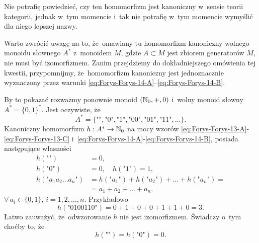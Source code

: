 \documentclass[a4paper,11pt]{article}
\begin{document}
Nie potrafię powiedzieć, czy ten homomorfizm jest kanoniczny w~sensie teorii
kategorii, jednak w~tym momencie i~tak nie potrafię w~tym momencie wymyślić
dla niego lepszej nazwy.

\vspace{\spaceFour}





\start {} Warto zwrócić uwagę na to, że~omawiany tu homomorfizm
kanoniczny wolnego monoidu słownego $A^{ * }$ z~monoidem $M$, gdzie
$A \subset M$ jest zbiorem generatorów $M$, nie musi być izomorfizmem. Zanim
przejdziemy do dokładniejszego omówienia tej kwestii, przypomnijmy,
że~homomorfizm kanoniczny jest jednoznacznie wyznaczony przez warunki
\eqref{eq:Forys-Forys-14-A}--\eqref{eq:Forys-Forys-14-B}.

By to pokazać rozważmy
ponownie monoid $( \mathbb{N}_{ 0 }, +, 0 )$ i~wolny monoid słowny
$A^{ * } = \{ 0, 1 \}^{ * }$. Jest
oczywiste, że
\begin{equation}
  \label{eq:Forys-Forys-15}
  A^{ * } =
  \{ \texttt{""}, \texttt{"} 0 \texttt{"}, \texttt{"} 1 \texttt{"},
  \texttt{"} 0 0 \texttt{"}, \texttt{"} 0 1 \texttt{"},
  \texttt{"} 1 1 \texttt{"}, \ldots \}.
\end{equation}
Kanoniczny homomorfizm $h : A^{ * } \to \mathbb{N}_{ 0 }$ na mocy wzorów
\eqref{eq:Forys-Forys-13-A}-\eqref{eq:Forys-Forys-13-C}
i~\eqref{eq:Forys-Forys-14-A}-\eqref{eq:Forys-Forys-14-B}, posiada
następujące własności
\begin{subequations}
  \begin{align}
    \label{eq:Forys-Forys-16-A}
    h( \texttt{""} ) &= 0, \\
    \label{eq:Forys-Forys-16-B}
    h( \texttt{"} 0 \texttt{"} ) &= 0, \quad
    h( \texttt{"} 1 \texttt{"} ) = 1, \\
    \label{eq:Forys-Forys-14-C}
    h( \texttt{"} a_{ 1 } a_{ 2 } \ldots a_{ n } \texttt{"} )
                     &= h( \texttt{"} a_{ 1 } \texttt{"} )
                       + h( \texttt{"} a_{ 2 } \texttt{"} ) + \ldots
                       + h( \texttt{"} a_{ n } \texttt{"} ) = \\
                     &= a_{ 1 } + a_{ 2 } + \ldots + a_{ n },
  \end{align}
\end{subequations}
$\forall \, a_{ i } \in \{ 0, 1 \}$, $i = 1, 2, \ldots, n$. Przykładowo
\begin{equation}
  \label{eq:Forys-Forys-17}
  h( \texttt{"} 0100110 \texttt{"} ) =
  0 + 1 + 0 + 0 + 1 + 1 + 0 = 3.
\end{equation}
Łatwo zauważyć, że~odwzorowanie $h$ nie jest izomorfizmem. Świadczy o~tym
choćby to, że
\begin{equation}
  \label{eq:Forys-Forys-18}
  h( \texttt{""} ) = h( \texttt{"} 0 \texttt{"} ) = 0.
\end{equation}
\end{document}
